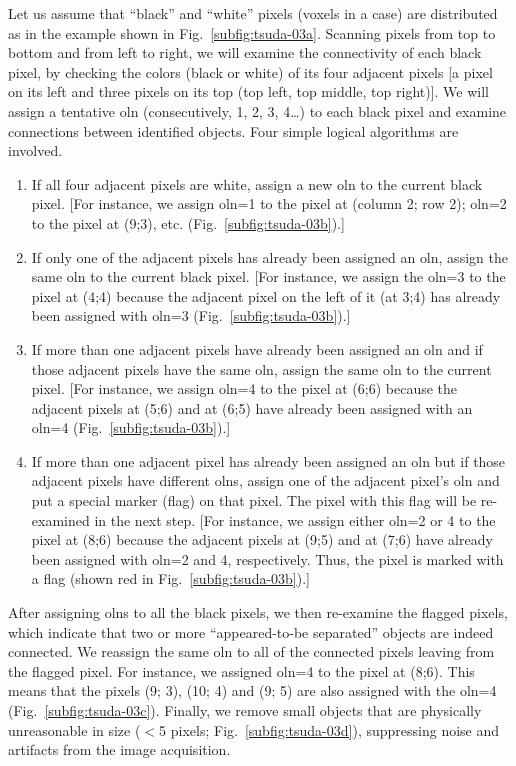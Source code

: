 Let us assume that ``black'' and ``white'' pixels (voxels in a \threed case) are distributed as in the example shown in Fig.~\ref{subfig:tsuda-03a}. Scanning pixels from top to bottom and from left to right, we will examine the connectivity of each black pixel, by checking the colors (black or white) of its four adjacent pixels [a pixel on its left and three pixels on its top (top left, top middle, top right)]. We will assign a tentative \acf{oln} (consecutively, 1, 2, 3, 4\ldots) to each black pixel and examine connections between identified objects. Four simple logical algorithms are involved.
\begin{enumerate}
	\item If all four adjacent pixels are white, assign a new \ac{oln} to the current black pixel. [For instance, we assign \ac{oln}=1 to the pixel at (column 2; row 2); \ac{oln}=2 to the pixel at (9;3), etc. (Fig.~\ref{subfig:tsuda-03b}).]
	\item If only one of the adjacent pixels has already been assigned an \ac{oln}, assign the same \ac{oln} to the current black pixel. [For instance, we assign the \ac{oln}=3 to the pixel at (4;4) because the adjacent pixel on the left of it (at 3;4) has already been assigned with \ac{oln}=3 (Fig.~\ref{subfig:tsuda-03b}).]
	\item If more than one adjacent pixels have already been assigned an \ac{oln} and if those adjacent pixels have the same \ac{oln}, assign the same \ac{oln} to the current pixel. [For instance, we assign \ac{oln}=4 to the pixel at (6;6) because the adjacent pixels at (5;6) and at (6;5) have already been assigned with an \ac{oln}=4 (Fig.~\ref{subfig:tsuda-03b}).]
	\item If more than one adjacent pixel has already been assigned an \ac{oln} but if those adjacent pixels have different \acp{oln}, assign one of the adjacent pixel's \ac{oln} and put a special marker (flag) on that pixel. The pixel with this flag will be re-examined in the next step. [For instance, we assign either \ac{oln}=2 or 4 to the pixel at (8;6) because the adjacent pixels at (9;5) and at (7;6) have already been assigned with \ac{oln}=2 and 4, respectively. Thus, the pixel is marked with a flag (shown red in Fig.~\ref{subfig:tsuda-03b}).]
\end{enumerate}
After assigning \acp{oln} to all the black pixels, we then re-examine the flagged pixels, which indicate that two or more ``appeared-to-be separated'' objects are indeed connected. We reassign the same \ac{oln} to all of the connected pixels leaving from the flagged pixel. For instance, we assigned \ac{oln}=4 to the pixel at (8;6). This means that the pixels (9; 3), (10; 4) and (9; 5) are also assigned with the \ac{oln}=4 (Fig.~\ref{subfig:tsuda-03c}). Finally, we remove small objects that are physically unreasonable in size ($<$5 pixels; Fig.~\ref{subfig:tsuda-03d}), suppressing noise and artifacts from the image acquisition.

